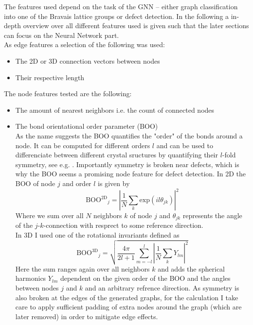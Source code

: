 \documentclass[11pt,a4paper]{article}
\begin{document}
The features used depend on the task of the GNN -- either graph classification into one of the Bravais lattice groups or defect detection. 
In the following a in-depth overview over all different features used is given such that the later sections can focus on the Neural Network part. \\
As edge features a selection of the following was used: 
\begin{itemize}
    \item The 2D or 3D connection vectors between nodes
    \item Their respective length
\end{itemize}
The node features tested are the following:
\begin{itemize}
    \item The amount of nearest neighbors i.e. the count of connected nodes
    \item The bond orientational order parameter (BOO)\\
    As the name suggests the BOO quantifies the "order" of the bonds around a node. 
    It can be computed for different orders $l$ and can be used to differenciate between different crystal sructures by quantifying their $l$-fold symmetry, see e.g. \cite{steinhardtBondorientationalOrderLiquids1983}. 
    Importantly symmetry is broken near defects, which is why the BOO seems a promising node feature for defect detection. 
    In 2D the BOO of node $j$ and order $l$ is given by
    \begin{equation}
        \label{eq:boo2d}
        \mathrm{BOO^{2D}}_j = \left|\frac{1}{N} \sum_k \mathrm{exp}(il\theta_{jk}) \right|^2
    \end{equation}
    Where we sum over all $N$ neighbors $k$ of node $j$ and $\theta_{jk}$ represents the angle of the $j$-$k$-connection with resprect to some reference direction. \\
    In 3D I used one of the rotational invariants defined as 
    \begin{equation}
        \mathrm{BOO^{3D}}_j = \sqrt{\frac{4\pi}{2l+1} \sum_{m=-l}^{l} \left| \frac{1}{N} \sum_k Y_{lm}\right|^2}
    \end{equation} 
    Here the sum ranges again over all neighbors $k$ and adds the spherical harmonics $Y_{lm}$ dependent on the given order of the BOO and the angles between nodes $j$ and $k$ and an arbitrary refrence direction. 
    As symmetry is also broken at the edges of the generated graphs, for the calculation I take care to apply sufficient padding of extra nodes around the graph (which are later removed) in order to mitigate edge effects. 
\end{itemize}
\end{document}
